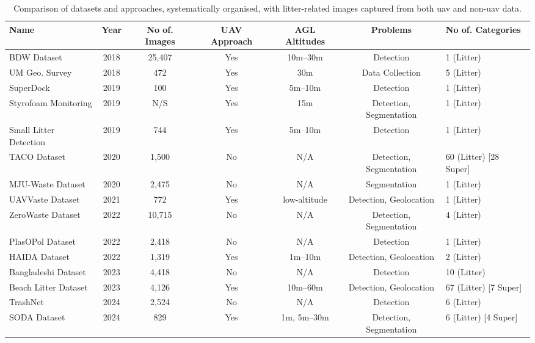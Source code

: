 \begin{table*}[htbp]
\centering
\scriptsize
\hspace*{-0.5in} %
\begin{tabular}{|l|c|c|c|c|c|l|}
\hline
\textbf{Name} & \textbf{Year} & \textbf{No of. Images} & \textbf{UAV Approach} & \textbf{AGL Altitudes} & \textbf{Problems} & \textbf{No of. Categories} \\ 
\hline \hline
BDW Dataset \cite{bdwdataset} & 2018 & 25,407 & Yes & 10m--30m & Detection & 1 (Litter) \\ \hline
UM Geo. Survey \cite{umgeosurvey} & 2018 & 472 & Yes & 30m & Data Collection & 5 (Litter) \\\hline
SuperDock \cite{superdock} & 2019 & 100 & Yes & 5m--10m & Detection & 1 (Litter) \\\hline
Styrofoam Monitoring \cite{styrofoam} & 2019 & N/S & Yes & 15m & Detection, Segmentation & 1 (Litter) \\\hline
Small Litter Detection \cite{small_litter_detection} & 2019 & 744 & Yes & 5m--10m & Detection & 1 (Litter) \\\hline
TACO Dataset \cite{taco2020} & 2020 & 1,500 & No & N/A & Detection, Segmentation & 60 (Litter) [28 Super] \\\hline
MJU-Waste Dataset \cite{mju_waste} & 2020 & 2,475 & No & N/A & Segmentation & 1 (Litter) \\\hline
UAVVaste Dataset \cite{uavvaste} & 2021 & 772 & Yes & low-altitude & Detection, Geolocation & 1 (Litter) \\\hline
ZeroWaste Dataset \cite{zerowaste} & 2022 & 10,715 & No & N/A & Detection, Segmentation & 4 (Litter) \\\hline
PlasOPol Dataset \cite{plastopol} & 2022 & 2,418 & No & N/A & Detection & 1 (Litter) \\\hline
HAIDA Dataset \cite{haida} & 2022 & 1,319 & Yes & 1m--10m & Detection, Geolocation & 2 (Litter) \\\hline
Bangladeshi Dataset \cite{bangladeshi} & 2023 & 4,418 & No & N/A & Detection & 10 (Litter) \\\hline
Beach Litter Dataset \cite{beach_litter} & 2023 & 4,126 & Yes & 10m--60m & Detection, Geolocation & 67 (Litter) [7 Super] \\\hline
TrashNet \cite{trashnet} & 2024 & 2,524 & No & N/A & Detection & 6 (Litter) \\\hline
SODA Dataset \cite{soda_dataset} & 2024 & 829 & Yes & 1m, 5m--30m & Detection, Segmentation & 6 (Litter) [4 Super] \\\hline
\end{tabular}
\caption{Comparison of datasets and approaches, systematically organised, with litter-related images captured from both \gls{uav} and non-\gls{uav} data.}
\label{tab:lit_review}
\end{table*}


